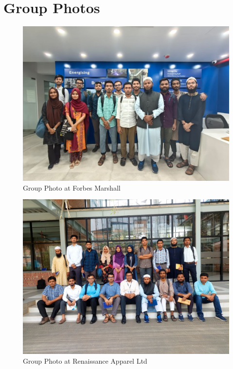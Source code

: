 \documentclass[12pt]{article}
\begin{document}
\sloppy





\newpage

\tableofcontents
\listoffigures











\section{Group Photos}
\begin{figure}[h!]
    \centering
    \includegraphics[width=0.7\linewidth]{figs/group_pic_fm.jpg}
    \caption{Group Photo at Forbes Marshall}
    \label{fig:group_pic_fm}
\end{figure}

\begin{figure}[h!]
    \centering
    \includegraphics[width=0.7\linewidth]{figs/group_pic_ral.jpg}
    \caption{Group Photo at Renaissance Apparel Ltd}
    \label{fig:group_pic_ral}
\end{figure}




\end{document}
